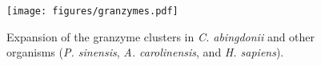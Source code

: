\begin{figure}                                                                             
    \begin{center}                                                                             
        \texttt{[image: figures/granzymes.pdf]}                            
        \caption[Expansion of the granzyme clusters in \textit{C. abingdonii} and other species]{\footnotesize Expansion of the granzyme clusters in \textit{C. abingdonii} and other organisms (\textit{P. sinensis}, \textit{A. carolinensis}, and \textit{H. sapiens}).}
        \label{app_f_results_george_degradome_granzymes}                                           
    \end{center}                                                                               
\end{figure}

